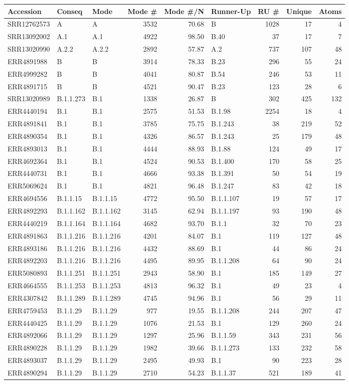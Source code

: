 \documentclass[
]{article}
\begin{document}
\begin{longtable}[]{@{}lllrrlrrr@{}}
\toprule
Accession & Conseq & Mode & Mode \# & Mode \#/N & Runner-Up & RU \# &
Unique & Atoms\tabularnewline
\midrule
\endhead
SRR12762573 & A & A & 3532 & 70.68 & B & 1028 & 17 & 4\tabularnewline
SRR13092002 & A.1 & A.1 & 4922 & 98.50 & B.40 & 37 & 17 &
7\tabularnewline
SRR13020990 & A.2.2 & A.2.2 & 2892 & 57.87 & A.2 & 737 & 107 &
48\tabularnewline
ERR4891988 & B & B & 3914 & 78.33 & B.23 & 296 & 55 & 24\tabularnewline
ERR4999282 & B & B & 4041 & 80.87 & B.54 & 246 & 53 & 11\tabularnewline
ERR4891715 & B & B & 4521 & 90.47 & B.23 & 123 & 28 & 6\tabularnewline
SRR13020989 & B.1.1.273 & B.1 & 1338 & 26.87 & B & 302 & 425 &
132\tabularnewline
ERR4440194 & B.1 & B.1 & 2575 & 51.53 & B.1.98 & 2254 & 18 &
4\tabularnewline
ERR4891841 & B.1 & B.1 & 3785 & 75.75 & B.1.243 & 38 & 219 &
52\tabularnewline
ERR4890354 & B.1 & B.1 & 4326 & 86.57 & B.1.243 & 25 & 179 &
48\tabularnewline
ERR4893013 & B.1 & B.1 & 4444 & 88.93 & B.1.88 & 124 & 49 &
17\tabularnewline
ERR4692364 & B.1 & B.1 & 4524 & 90.53 & B.1.400 & 170 & 58 &
25\tabularnewline
ERR4440731 & B.1 & B.1 & 4666 & 93.38 & B.1.391 & 50 & 54 &
19\tabularnewline
ERR5069624 & B.1 & B.1 & 4821 & 96.48 & B.1.247 & 83 & 42 &
18\tabularnewline
ERR4694556 & B.1.1.15 & B.1.1.15 & 4772 & 95.50 & B.1.1.107 & 19 & 57 &
17\tabularnewline
ERR4892293 & B.1.1.162 & B.1.1.162 & 3145 & 62.94 & B.1.1.197 & 93 & 190
& 48\tabularnewline
ERR4440219 & B.1.1.164 & B.1.1.164 & 4682 & 93.70 & B.1.1 & 32 & 70 &
23\tabularnewline
ERR4891863 & B.1.1.216 & B.1.1.216 & 4201 & 84.07 & B.1 & 119 & 127 &
48\tabularnewline
ERR4893186 & B.1.1.216 & B.1.1.216 & 4432 & 88.69 & B.1 & 44 & 86 &
24\tabularnewline
ERR4892203 & B.1.1.216 & B.1.1.216 & 4495 & 89.95 & B.1.1.208 & 64 & 90
& 24\tabularnewline
ERR5080893 & B.1.1.251 & B.1.1.251 & 2943 & 58.90 & B.1 & 185 & 149 &
27\tabularnewline
ERR4664555 & B.1.1.253 & B.1.1.253 & 4813 & 96.32 & B.1 & 49 & 23 &
4\tabularnewline
ERR4307842 & B.1.1.289 & B.1.1.289 & 4745 & 94.96 & B.1 & 56 & 29 &
11\tabularnewline
ERR4759453 & B.1.1.29 & B.1.1.29 & 977 & 19.55 & B.1.1.208 & 244 & 207 &
47\tabularnewline
ERR4440425 & B.1.1.29 & B.1.1.29 & 1076 & 21.53 & B.1 & 129 & 260 &
24\tabularnewline
ERR4892066 & B.1.1.29 & B.1.1.29 & 1297 & 25.96 & B.1.1.59 & 343 & 231 &
56\tabularnewline
ERR4890228 & B.1.1.29 & B.1.1.29 & 1982 & 39.66 & B.1.1.273 & 133 & 232
& 58\tabularnewline
ERR4893037 & B.1.1.29 & B.1.1.29 & 2495 & 49.93 & B.1 & 90 & 223 &
28\tabularnewline
ERR4890294 & B.1.1.29 & B.1.1.29 & 2710 & 54.23 & B.1.1.37 & 521 & 189 &
41\tabularnewline

\end{longtable}
\end{document}
